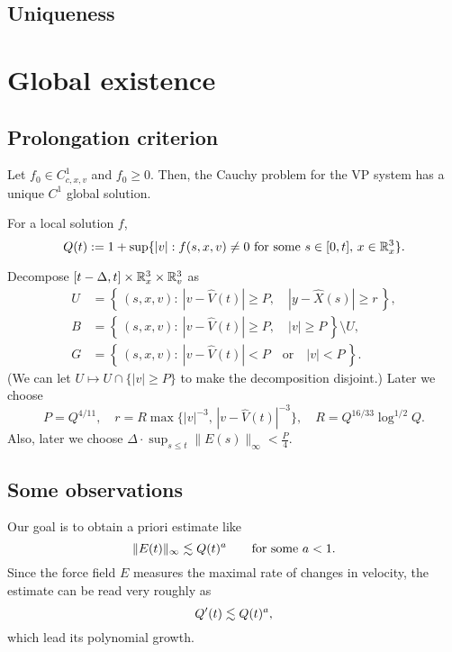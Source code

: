 \documentclass[11pt]{amsart}
\begin{document}
\subsection{Uniqueness}










\section{Global existence}


\subsection{Prolongation criterion}

\begin{thm*}[Schaeffer, 1991]
Let $f_0\in C_{c,x,v}^1$ and $f_0\ge0$.
Then, the Cauchy problem for the VP system has a unique $C^1$ global solution.
\end{thm*}

\begin{defn}
For a local solution $f$,
\[Q(t):=1+\sup\{|v|:f(s,x,v)\ne0\text{ for some }s\in[0,t],\,x\in\mathbb{R}_x^3\}.\]
\end{defn}

Decompose $[t-\Delta,t]\times\mathbb{R}_x^3\times\mathbb{R}_v^3$ as
\begin{align*}
U&=\left\{\,(s,x,v):\ |v-\hat V(t)|\ge P,\quad|y-\hat X(s)|\ge r\,\right\},\\
B&=\left\{\,(s,x,v):\ |v-\hat V(t)|\ge P,\quad|v|\ge P\,\right\}\setminus U,\\
G&=\left\{\,(s,x,v):\ |v-\hat V(t)|<P\quad\text{or}\quad|v|<P\,\right\}.
\end{align*}
(We can let $U\mapsto U\cap\{|v|\ge P\}$ to make the decomposition disjoint.)
Later we choose
\[P=Q^{4/11},\quad r=R\max\{|v|^{-3},\,|v-\hat V(t)|^{-3}\},\quad R=Q^{16/33}\log^{1/2}Q.\]
Also, later we choose $\Delta\cdot\sup_{s\le t}\|E(s)\|_\infty<\frac P4$.



\subsection{Some observations}
Our goal is to obtain a priori estimate like
\[\|E(t)\|_\infty\lesssim Q(t)^a\qquad\text{for some }a<1.\]
Since the force field $E$ measures the maximal rate of changes in velocity, the estimate can be read very roughly as
\[Q'(t)\lesssim Q(t)^a,\]
which lead its polynomial growth.
\end{document}
